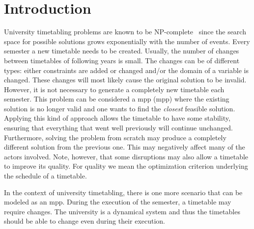 \documentclass[runningheads]{llncs}
\begin{document}
\begin{abstract}

  
\end{abstract}
\section{Introduction}


University timetabling problems are known to be NP-complete~\cite{DBLP:journals/siamcomp/EvenIS76} since the search space for possible solutions grows exponentially with the number of events. Every semester a new timetable needs to be created. Usually, the number of changes between timetables of following years is small. The changes can be of different types: either constraints are added or changed and/or the domain of a variable is changed. These changes will most likely cause the original solution to be invalid. However, it is not necessary to generate a completely new timetable each semester. This problem can be considered a \acrlong{mpp} (\gls{mpp}) where the existing solution is no longer valid and one wants to find the \textit{closest} feasible solution. Applying this kind of approach allows the timetable to have some stability, ensuring that everything that went well previously will continue unchanged.  Furthermore, solving the problem from scratch may produce a completely different solution from the previous one.  This may negatively affect many of the actors involved. Note, however, that some disruptions may also allow a timetable to improve its quality. For quality we mean the optimization criterion underlying the schedule of a timetable. %

In the context of university timetabling, there is one more scenario that can be modeled as an \gls{mpp}. During the execution of the semester, a timetable may require changes. The university is a dynamical system and thus the timetables should be able to change even during their execution.
\end{document}
